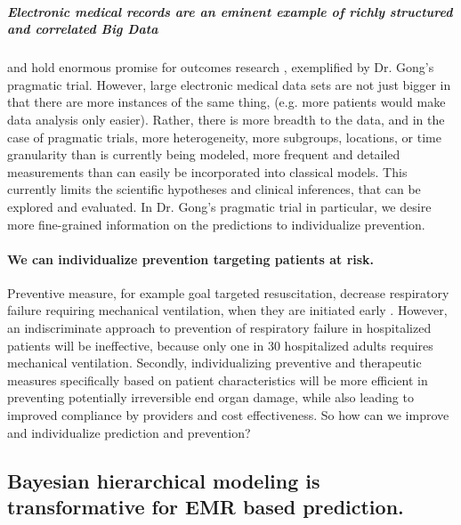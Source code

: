 \documentclass[11pt,notitlepage]{article}
\begin{document}
\subparagraph{Electronic medical records are an eminent example of richly structured and correlated Big Data} 
and hold enormous promise for outcomes research \cite{Dean_19279318,Amarasingham20940649},  exemplified by Dr. Gong's pragmatic trial. However, large electronic medical data sets are not just bigger in that there are more instances of the same thing, (e.g. more patients would make data analysis only easier).  Rather, there is more breadth to the data, and in the case of pragmatic trials, more heterogeneity, more subgroups, locations, or time granularity than is currently being modeled, more frequent and detailed measurements than can easily be incorporated into classical models.  This currently limits the scientific hypotheses and clinical inferences, that can be explored and evaluated. In Dr. Gong's pragmatic trial in particular, we desire more fine-grained information on the predictions to individualize prevention.  

\paragraph*{We can individualize prevention targeting patients at risk.}
Preventive measure, for example goal targeted resuscitation, decrease respiratory failure requiring mechanical ventilation, when they are initiated early \cite{Rivers_12594312}. However, an indiscriminate approach to prevention of respiratory failure in hospitalized patients will be ineffective, because only one in 30 hospitalized adults requires mechanical ventilation. Secondly, individualizing preventive and therapeutic measures specifically based on patient characteristics will be more efficient in preventing potentially irreversible end organ damage, while also  leading to improved compliance by providers and cost effectiveness. So how can we improve and individualize prediction and prevention? 

\subsection*{Bayesian hierarchical modeling is transformative for EMR based prediction.}
\end{document}
